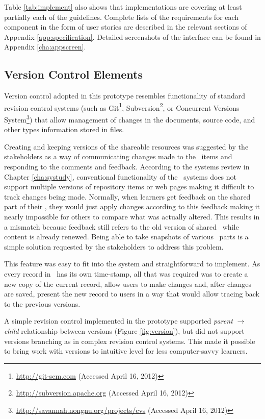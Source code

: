 \FloatBarrier

Table \ref{tab:implement} also shows that implementations are covering at least
partially each of the guidelines. Complete lists of the requirements for each
component in the form of user stories are described in the relevant sections of
Appendix \ref{app:specification}. Detailed screenshots of the interface can be
found in Appendix \ref{cha:appscreen}.

\subsection{Version Control Elements}
\label{sec:version}

Version control adopted in this prototype resembles functionality of standard
revision control systems (such as Git\footnote{\url{http://git-scm.com}
(Accessed April 16, 2012)},
Subversion\footnote{\url{http://subversion.apache.org} (Accessed April 16,
2012)}, or Concurrent Versions
System\footnote{\url{http://savannah.nongnu.org/projects/cvs} (Accessed April
16, 2012)}) that allow management of changes in the documents, source code, and
other types information stored in files.

Creating and keeping versions of the shareable resources was suggested by the
stakeholders as a way of communicating changes made to the \ep~items and
responding to the comments and feedback. According to the systems review in
Chapter \ref{cha:systudy}, conventional functionality of the \ep~systems does not
support multiple versions of repository items or web pages making it difficult
to track changes being made. Normally, when learners get feedback on the shared
part of their \ep, they would just apply changes according to this feedback
making it nearly impossible for others to compare what was actually altered.
This results in a mismatch because feedback still refers to the old version of
shared \ep~while content is already renewed. Being able to take snapshots of
various \ep~parts is a simple solution requested by the stakeholders to address
this problem.

This feature was easy to fit into the system and straightforward to implement.
As every record in \ep~has its own time-stamp, all that was required was to
create a new copy of the current record, allow users to make changes and,
after changes are saved, present the new record to users in a way that would
allow tracing back to the previous versions.

A simple revision control implemented in the prototype supported \textit{parent}
$\to$ \textit{child} relationship between versions (Figure \ref{fig:version}),
but did not support versions branching as in complex revision control systems.
This made it possible to bring work with versions to intuitive level for less
computer-savvy learners.

